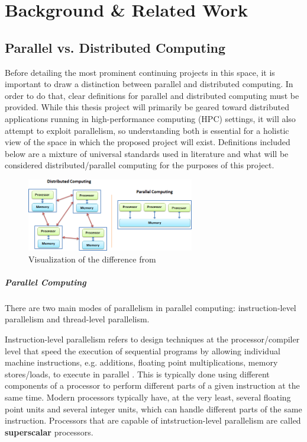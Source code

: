\chapter{Background \& Related Work}

\section{Parallel vs. Distributed Computing}
Before detailing the most prominent continuing projects in this space, it is important to draw a distinction between parallel and distributed computing. In order to do that, clear definitions for parallel and distributed computing must be provided. While this thesis project will primarily be geared toward distributed applications running in high-performance computing (HPC) settings, it will also attempt to exploit parallelism, so understanding both is essential for a holistic view of the space in which the proposed project will exist. Definitions included below are a mixture of universal standards used in literature and what will be considered distributed/parallel computing for the purposes of this project.

\begin{figure}[h]
\centering
\includegraphics[width=0.65\textwidth]{Figures/parallel_vs_distributed.png}
\caption{Visualization of the difference from \cite{dist_java}}
\label{fig:dist_v_parallel}
\end{figure}

\paragraph{Parallel Computing}
There are two main modes of parallelism in parallel computing: instruction-level parallelism and thread-level parallelism. 

Instruction-level parallelism refers to design techniques at the processor/compiler level that speed the execution of sequential programs by allowing individual machine instructions, e.g. additions, floating point multiplications, memory stores/loads, to execute in parallel \cite{ilp_history}. This is typically done using different components of a processor to perform different parts of a given instruction at the same time. Modern processors typically have, at the very least, several floating point units and several integer units, which can handle different parts of the same instruction. Processors that are capable of intstruction-level parallelism are called \textbf{superscalar} processors.

